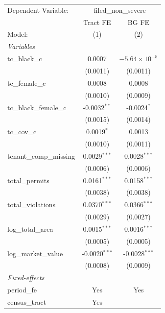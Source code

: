 \begin{tabular}{lcc}
   \tabularnewline \midrule \midrule
   Dependent Variable: & \multicolumn{2}{c}{filed\_non\_severe}\\
                           & Tract FE        & BG FE \\   
   Model:                  & (1)             & (2)\\  
   \midrule
   \emph{Variables}\\
   tc\_black\_c            & 0.0007          & $-5.64\times 10^{-5}$\\    
                           & (0.0011)        & (0.0011)\\   
   tc\_female\_c           & 0.0008          & 0.0008\\   
                           & (0.0010)        & (0.0009)\\   
   tc\_black\_female\_c    & -0.0032$^{**}$  & -0.0024$^{*}$\\   
                           & (0.0015)        & (0.0014)\\   
   tc\_cov\_c              & 0.0019$^{*}$    & 0.0013\\   
                           & (0.0010)        & (0.0011)\\   
   tenant\_comp\_missing   & 0.0029$^{***}$  & 0.0028$^{***}$\\   
                           & (0.0006)        & (0.0006)\\   
   total\_permits          & 0.0161$^{***}$  & 0.0158$^{***}$\\   
                           & (0.0038)        & (0.0038)\\   
   total\_violations       & 0.0370$^{***}$  & 0.0366$^{***}$\\   
                           & (0.0029)        & (0.0027)\\   
   log\_total\_area        & 0.0015$^{***}$  & 0.0016$^{***}$\\   
                           & (0.0005)        & (0.0005)\\   
   log\_market\_value      & -0.0020$^{***}$ & -0.0028$^{***}$\\   
                           & (0.0008)        & (0.0009)\\   
   \midrule
   \emph{Fixed-effects}\\
   period\_fe              & Yes             & Yes\\  
   census\_tract           & Yes             & \\  

\end{tabular}
